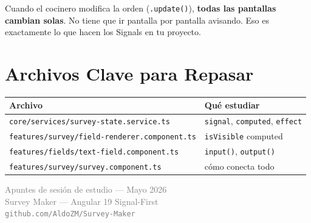\documentclass[12pt, a4paper]{article}
\begin{document}
Cuando el cocinero modifica la orden (\texttt{.update()}),
\textbf{todas las pantallas cambian solas}.
No tiene que ir pantalla por pantalla avisando.
Eso es exactamente lo que hacen los Signals en tu proyecto.

\section{ Archivos Clave para Repasar}

\begin{center}
\renewcommand{\arraystretch}{1.6}
\begin{tabular}{p{7.5cm} p{5cm}}
\toprule
\textbf{Archivo} & \textbf{Qué estudiar} \\
\midrule
\texttt{core/services/survey-state.service.ts} & \texttt{signal}, \texttt{computed}, \texttt{effect} \\
\texttt{features/survey/field-renderer.component.ts} & \texttt{isVisible} computed \\
\texttt{features/fields/text-field.component.ts} & \texttt{input()}, \texttt{output()} \\
\texttt{features/survey/survey.component.ts} & cómo conecta todo \\
\bottomrule
\end{tabular}
\end{center}

\vfill
\begin{center}
  \textcolor{gray}{\small {} Apuntes de sesión de estudio — Mayo 2026}\\[0.2cm]
  \textcolor{gray}{\small Survey Maker — Angular 19 Signal-First}\\[0.2cm]
  \textcolor{gray}{\small \texttt{github.com/AldoZM/Survey-Maker}}
\end{center}
\end{document}
